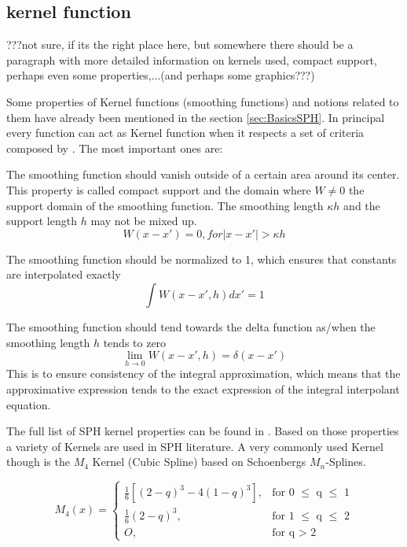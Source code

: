 \documentclass{report}
\begin{document}
\subsection{kernel function}
\label{sec:KernelFunction}
???not sure, if its the right place here, but somewhere there should be a
paragraph with more detailed information on kernels used, compact support,
perhaps even some properties,...(and perhaps some graphics???)


Some properties of Kernel functions (smoothing functions) and notions related
to them have already been mentioned in the section
\ref{sec:BasicsSPH}. In principal every function can act as Kernel function
when it respects a set of criteria composed by \cite{Liu2003}.
The most important ones are:

The smoothing function should vanish outside of a certain area around its
center. This property is called compact support and the domain where $W\neq0$
the support domain of the smoothing function. The smoothing length $\kappa h$ and the
support length $h$ may not be mixed up.
\begin{equation}
W(x-x')=0,\textit{for}|x-x'|>\kappa h
\end{equation}

The smoothing function should be normalized to 1, which ensures that constants
are interpolated exactly
\begin{equation}
\int{W(x-x',h)dx'}=1
\end{equation}

The smoothing function should tend towards the delta function as/when the smoothing
length $h$ tends to zero
\begin{equation}
\lim\limits_{h \rightarrow 0}{W(x-x',h)}=\delta(x-x')
\end{equation}
This is to ensure consistency of the integral approximation, which means that
the approximative expression tends to the exact expression of the integral
interpolant equation.

The full list of SPH kernel properties can be found in  \cite{Liu2003}.
Based on those properties a variety of Kernels are used in SPH literature. A
very commonly used Kernel though is the $M_4$ Kernel (Cubic Spline) based on Schoenbergs
$M_n$-Splines\cite{Schoenberg1946}.

\begin{equation}
\label{eq:cubicSpline}
M_{4}(x)=\begin{cases}
\frac{1}{6}[(2-q)^{3}-4(1-q)^{3}],& \text{for 0 $\leq$ q $\leq$ 1} \\
\frac{1}{6}(2-q)^{3},&  \text{for 1 $\leq$ q $\leq$ 2} \\
O,& \text{for q $>$ 2}
\end{cases}
\end{equation}
\end{document}
